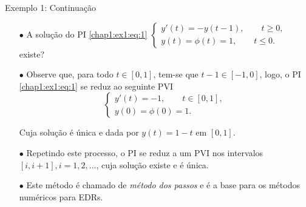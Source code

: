\documentclass{beamer}
\theoremstyle{plain}
\theoremstyle{definition}
\begin{document}

\begin{frame}{Exemplo 1: Continuação}
        \begin{itemize}
            \item[$\bullet$] A solução do PI \eqref{chap1:ex1:eq:1}
                $
                \begin{cases}
                    y'(t) = -y(t - 1), \qquad t \geq 0, \\
                    y(t) = \phi(t) = 1, \qquad t \leq 0.
                \end{cases} 
                $
                existe?
            \item[$\bullet$] Observe que, para todo $t \in [0,1]$, tem-se que $t-1 \in [-1, 0]$, logo, o PI \eqref{chap1:ex1:eq:1} se reduz ao seguinte PVI
                \begin{equation*}
                    \begin{cases}
                        y'(t) = -1, \qquad t \in [0, 1], \\
                        y(0) = \phi(0) = 1.
                    \end{cases} 
                \end{equation*}

                Cuja solução é única e dada por $y(t) = 1 - t$ em $[0, 1]$. 
        
            \item[$\bullet$] Repetindo este processo, o PI se reduz a um PVI nos intervalos $[i, i+1], i = 1, 2, \dots$, cuja solução existe e é única. 
            \item[$\bullet$] Este método é chamado de \textit{método dos passos} e é a base para os métodos numéricos para EDRs.
        \end{itemize}


\end{frame}


\end{document}
